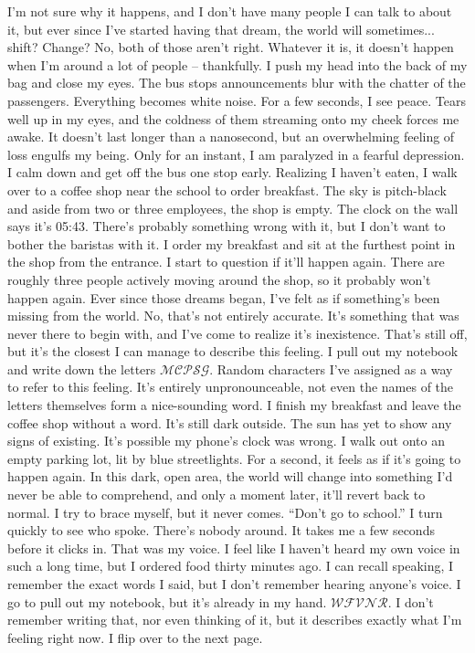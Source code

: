 \documentclass[a4paper, 12pt]{book}
\newcommand\tab[1][1cm]{\hspace*{#1}}
\begin{document}
\tab
I’m not sure why it happens, and I don’t have many people I can talk to about it, but ever since I’ve started having that dream, the world will sometimes... shift? Change? No, both of those aren’t right. Whatever it is, it doesn’t happen when I’m around a lot of people -- thankfully.
\newline
\tab
I push my head into the back of my bag and close my eyes. The bus stops announcements blur with the chatter of the passengers. Everything becomes white noise. For a few seconds, I see peace. Tears well up in my eyes, and the coldness of them streaming onto my cheek forces me awake. It doesn’t last longer than a nanosecond, but an overwhelming feeling of loss engulfs my being. Only for an instant, I am paralyzed in a fearful depression. I calm down and get off the bus one stop early. Realizing I haven’t eaten, I walk over to a coffee shop near the school to order breakfast. The sky is pitch-black and aside from two or three employees, the shop is empty. The clock on the wall says it’s 05:43. There’s probably something wrong with it, but I don’t want to bother the baristas with it. I order my breakfast and sit at the furthest point in the shop from the entrance. I start to question if it’ll happen again. There are roughly three people actively moving around the shop, so it probably won’t happen again.
\newline
\tab
Ever since those dreams began, I’ve felt as if something’s been missing from the world. No, that’s not entirely accurate. It’s something that was never there to begin with, and I’ve come to realize it’s inexistence. That’s still off, but it’s the closest I can manage to describe this feeling. I pull out my notebook and write down the letters $\mathcal{MCPSG}$. Random characters I’ve assigned as a way to refer to this feeling. It’s entirely unpronounceable, not even the names of the letters themselves form a nice-sounding word.
\newline
\tab
I finish my breakfast and leave the coffee shop without a word. It’s still dark outside. The sun has yet to show any signs of existing. It’s possible my phone’s clock was wrong. I walk out onto an empty parking lot, lit by blue streetlights. For a second, it feels as if it’s going to happen again. In this dark, open area, the world will change into something I’d never be able to comprehend, and only a moment later, it’ll revert back to normal. I try to brace myself, but it never comes.
\newline
\tab
``Don’t go to school.'' I turn quickly to see who spoke. There’s nobody around. It takes me a few seconds before it clicks in. That was my voice. I feel like I haven’t heard my own voice in such a long time, but I ordered food thirty minutes ago. I can recall speaking, I remember the exact words I said, but I don’t remember hearing anyone’s voice. I go to pull out my notebook, but it’s already in my hand. $\mathcal{WFVNR}$. I don’t remember writing that, nor even thinking of it, but it describes exactly what I’m feeling right now. I flip over to the next page. 
\end{document}
